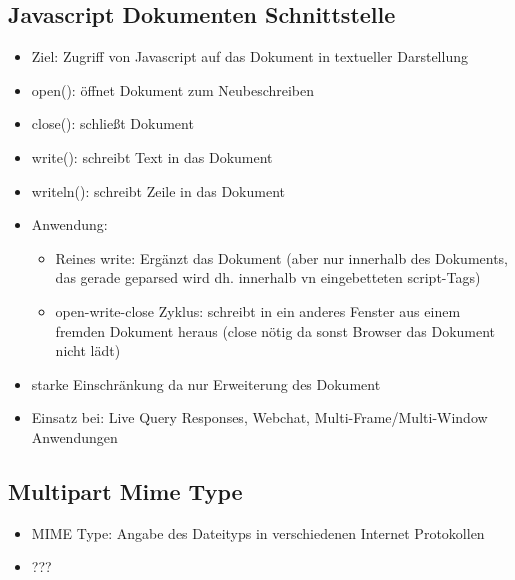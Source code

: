 \documentclass{article} %
\begin{document}
	\subsection{Javascript Dokumenten Schnittstelle}
	\begin{itemize}
		\item Ziel: Zugriff von Javascript auf das Dokument in textueller Darstellung
		\item open(): öffnet Dokument zum Neubeschreiben
		\item close(): schließt Dokument
		\item write(): schreibt Text in das Dokument
		\item writeln(): schreibt Zeile in das Dokument
		\item Anwendung:
		\begin{itemize}
			\item Reines write: Ergänzt das Dokument (aber nur innerhalb des Dokuments, das gerade geparsed wird dh. innerhalb vn eingebetteten script-Tags)
			\item open-write-close Zyklus: schreibt in ein anderes Fenster aus einem fremden Dokument heraus (close nötig da sonst Browser das Dokument nicht lädt)
		\end{itemize}
		\item starke Einschränkung da nur Erweiterung des Dokument
		\item Einsatz bei: Live Query Responses, Webchat, Multi-Frame/Multi-Window Anwendungen
	\end{itemize}
	\subsection{Multipart Mime Type}
	\begin{itemize}
		\item MIME Type: Angabe des Dateityps in verschiedenen Internet Protokollen
		\item ???
	\end{itemize}
\end{document}
